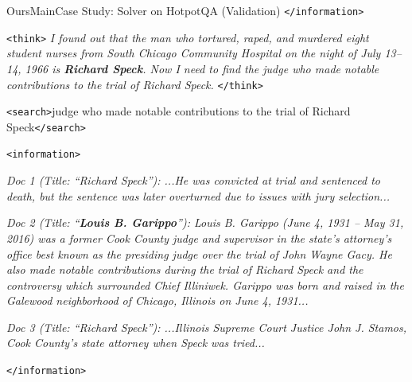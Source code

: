 \begin{casepagebox}{OursMain}{Case Study: Solver on HotpotQA (Validation)}
\textcolor{TagInfo}{\texttt{</information>}}
\vspace{3mm}

\begin{thinkpanel}
\textcolor{TagThink}{\texttt{<think>}} \textit{I found out that the man who tortured, raped, and murdered eight student nurses from South Chicago Community Hospital on the night of July 13--14, 1966 is \colorbox{yellow!30}{\textbf{Richard Speck}}. Now I need to find the judge who made notable contributions to the trial of Richard Speck.} \textcolor{TagThink}{\texttt{</think>}}
\end{thinkpanel}

\textcolor{TagSearch}{\texttt{<search>}}judge who made notable contributions to the trial of Richard Speck\textcolor{TagSearch}{\texttt{</search>}}

\textcolor{TagInfo}{\texttt{<information>}}

\textit{Doc 1 (Title: ``Richard Speck''): ...He was convicted at trial and sentenced to death, but the sentence was later overturned due to issues with jury selection...}

\textit{Doc 2 (Title: ``\colorbox{yellow!30}{\textbf{Louis B. Garippo}}''): Louis B. Garippo (\colorbox{yellow!30}{June 4, 1931} -- May 31, 2016) was a former Cook County judge and supervisor in the state's attorney's office best known as the presiding judge over the trial of John Wayne Gacy. He also \colorbox{yellow!30}{made notable contributions during the trial of Richard Speck} and the controversy which surrounded Chief Illiniwek. Garippo was born and raised in the Galewood neighborhood of Chicago, Illinois on June 4, 1931...}

\textit{Doc 3 (Title: ``Richard Speck''): ...Illinois Supreme Court Justice John J. Stamos, Cook County's state attorney when Speck was tried...}

\textcolor{TagInfo}{\texttt{</information>}}
\vspace{3mm}
\end{casepagebox}

